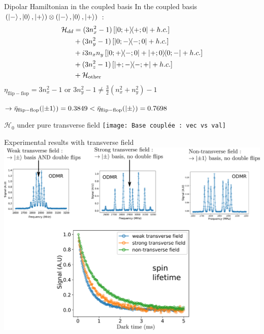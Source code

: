 \documentclass{beamer}
\begin{document}
\begin{frame}{Dipolar Hamiltonian in the coupled basis}
\setcounter{equation}{0}
In the coupled basis $(\ket{-},\ket{0},\ket{+}) \otimes (\ket{-},\ket{0},\ket{+})$ :
\begin{align}
  \mathcal{H}_{dd}&=(3n_x^2-1)\left[\op{0;+}{+;0}+ h.c. \right]\\
  &+(3n_y^2-1)\left[\op{0;-}{-;0}+ h.c. \right]\\
  &+i3n_x n_y\left[\op{0;+}{-;0}+\op{+;0}{0;-} +h.c. \right]\\
  &+(3n_z^2-1)\left[\op{+;-}{-;+}+ h.c.\right]\\
  &+\mathcal{H}_{\mathrm{other}}
  \end{align}
  $\eta_{\mathrm{flip-flop}} = 3n_x^2-1$ or $3n_y^2-1 \neq \frac{3}{2}(n_x^2+n_y^2)-1$ 
  
  $\to \bar \eta_{\mathrm{flip-flop}}(\ket{\pm 1})=0.3849 < \bar \eta_{\mathrm{flip-flop}}(\ket{\pm})=0.7698$
\end{frame}
\begin{frame}{$\mathcal{H}_0$ under pure transverse field}
\centering
\texttt{[image: Base couplée : vec vs val]}
\end{frame}
\begin{frame}{Experimental results with transverse field}
\centering
\includegraphics[width=\textwidth,height=0.9\textheight,keepaspectratio]{Champ transverse mesures}
\end{frame}
\end{document}
